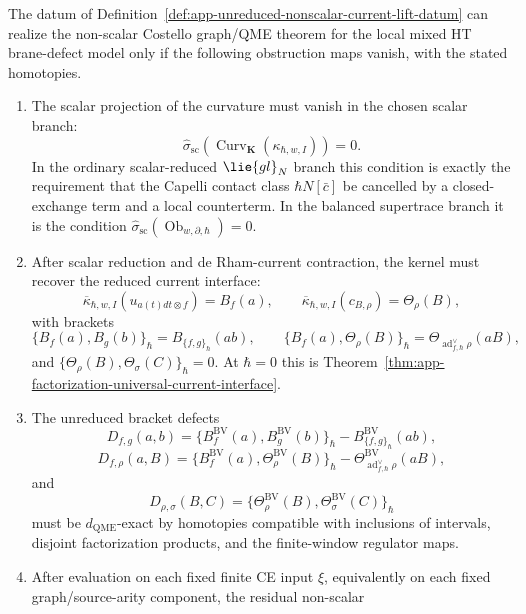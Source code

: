 \begin{prop}
\label{prop:app-nonscalar-current-lift-obstructions}
  The datum of
  Definition~\ref{def:app-unreduced-nonscalar-current-lift-datum} can
  realize the non-scalar Costello graph/QME theorem for the local mixed HT
  brane-defect model only if the following obstruction maps vanish, with
  the stated homotopies.
  \begin{enumerate}
    \item The scalar projection of the curvature must vanish in the
    chosen scalar branch:
    \[
      \widehat\sigma_{\mathrm{sc}}\!\left(
      \operatorname{Curv}_{\mathbf K}(\kappa_{\hbar,w,I})
      \right)=0.
    \]
    In the ordinary scalar-reduced \(\lie{gl}_N\) branch this condition is
    exactly the requirement that the Capelli contact class
    \(\hbar N[\bar c]\) be cancelled by a closed-exchange term and a local
    counterterm.  In the balanced supertrace branch it is the condition
    \(\widehat\sigma_{\mathrm{sc}}
    (\operatorname{Ob}_{w,\partial,\hbar})=0\).
    \item After scalar reduction and de Rham-current contraction, the
    kernel must recover the reduced current interface:
    \[
      \overline{\kappa}_{\hbar,w,I}
      (u_{a(t)dt\otimes f})=B_f(a),\qquad
      \overline{\kappa}_{\hbar,w,I}(c_{B,\rho})=\Theta_\rho(B),
    \]
    with brackets
    \[
      \{B_f(a),B_g(b)\}_\hbar=B_{\{f,g\}_\hbar}(ab),\qquad
      \{B_f(a),\Theta_\rho(B)\}_\hbar
        =\Theta_{\operatorname{ad}^{\vee}_{f,\hbar}\rho}(aB),
    \]
    and \(\{\Theta_\rho(B),\Theta_\sigma(C)\}_\hbar=0\).
    At \(\hbar=0\) this is
    Theorem~\ref{thm:app-factorization-universal-current-interface}.
    \item The unreduced bracket defects
    \[
      D_{f,g}(a,b)=
      \{B_f^{\mathrm{BV}}(a),B_g^{\mathrm{BV}}(b)\}_\hbar
        -B_{\{f,g\}_\hbar}^{\mathrm{BV}}(ab),
    \]
    \[
      D_{f,\rho}(a,B)=
      \{B_f^{\mathrm{BV}}(a),\Theta_\rho^{\mathrm{BV}}(B)\}_\hbar
        -\Theta_{\operatorname{ad}^{\vee}_{f,\hbar}\rho}^{\mathrm{BV}}(aB),
    \]
    and
    \[
      D_{\rho,\sigma}(B,C)=
      \{\Theta_\rho^{\mathrm{BV}}(B),
        \Theta_\sigma^{\mathrm{BV}}(C)\}_\hbar
    \]
    must be \(d_{\mathrm{QME}}\)-exact by homotopies compatible with
    inclusions of intervals, disjoint factorization products, and the
    finite-window regulator maps.
    \item After evaluation on each fixed finite CE input \(\xi\), equivalently
    on each fixed graph/source-arity component, the residual non-scalar

\end{enumerate}
\end{prop}
